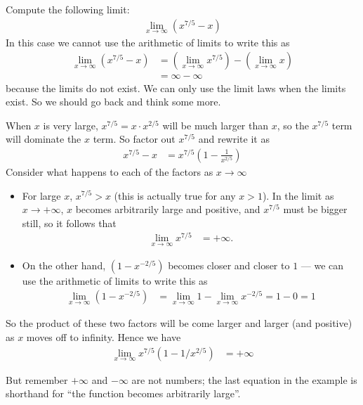\begin{eg}
Compute the following limit:
\begin{align*}
  \lim_{x \to \infty} \left( x^{7/5}-x \right)
\end{align*}
In this case we cannot use the arithmetic of limits to write this as
\begin{align*}
  \lim_{x \to \infty} \left( x^{7/5}-x \right)
  &= \left( \lim_{x \to \infty} x^{7/5}\right)
  - \left( \lim_{x \to \infty} x \right) \\
  &= \infty -\infty
\end{align*}
because the limits do not exist. We can only use the limit laws when the limits
exist. So we should go back and think some more.

When $x$ is very large, $x^{7/5} = x\cdot x^{2/5}$ will be much larger than $x$, so the
$x^{7/5}$ term will dominate the $x$ term. So factor out $x^{7/5}$ and rewrite it as
\begin{align*}
  x^{7/5}-x &= x^{7/5} \left(1 - \frac{1}{x^{2/5}} \right)
\end{align*}
Consider what happens to each of the factors as $x \to \infty$
\begin{itemize}
 \item For large $x$, $x^{7/5}>x$ (this is actually true for any $x>1$).
In the limit as $x \to +\infty$, $x$ becomes arbitrarily large and
positive, and $x^{7/5}$ must be bigger still, so it follows that
\begin{align*}
  \lim_{x \to \infty} x^{7/5} &= + \infty.
\end{align*}
 \item On the other hand, $(1-x^{-2/5})$ becomes closer and closer to $1$ ---
we can use the arithmetic of limits to write this as
\begin{align*}
  \lim_{x \to \infty} (1-x^{-2/5}) &= \lim_{x \to \infty} 1 - \lim_{x \to
\infty} x^{-2/5} = 1-0 = 1
\end{align*}
\end{itemize}
So the product of these two factors will be come larger and larger (and
positive) as $x$ moves off to infinity. Hence we have
\begin{align*}
  \lim_{x \to \infty} x^{7/5} \left(1 - 1/x^{2/5} \right) &= + \infty
\end{align*}
\end{eg}
But remember $+\infty$ and $-\infty$ are not numbers; the last equation in the example is
shorthand for ``the function becomes arbitrarily large''.

